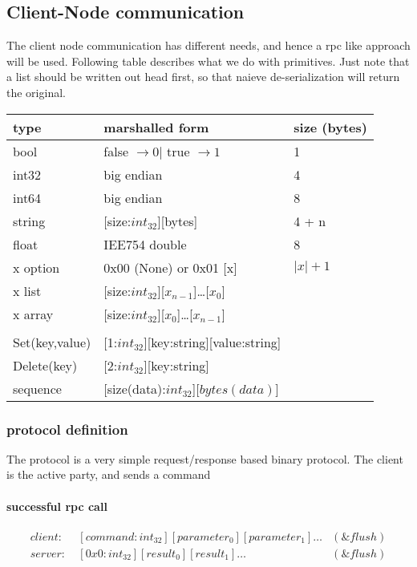 \subsection{Client-Node communication}
The client node communication has different needs, and hence a rpc like approach will be used. Following table describes what we do with primitives.
Just note that a list should be written out head first, so that naieve de-serialization will return the original.
\begin{table}[ht]
\begin{tabular}{lll}
type  &   marshalled form & size (bytes)          \\
\hline
bool        & false $\rightarrow 0 | $ true $ \rightarrow 1   $ & 1 \\
int32       & big endian          & 4             \\
int64       & big endian          & 8             \\
string      & [size:$int_{32}$][bytes] & 4 + n     \\
float       & IEE754 double       & 8             \\
x option    & 0x00 (None) or 0x01 [x] & $|x| + 1$ \\
x list      & [size:$int_{32}$][$x_{n-1}$]\ldots[$x_{0}$] \\
x array     & [size:$int_{32}$][$x_{0}$]\ldots[$x_{n-1}$] \\
\hline \\
Set(key,value) & [1:$int_{32}$][key:string][value:string]\\
Delete(key) & [2:$int_{32}$][key:string]\\
sequence    & [size(data):$int_{32}$][$bytes(data)$] \\
\hline
\end{tabular}
\end{table}

\subsubsection{protocol definition}
The protocol is a very simple request/response based binary protocol.
The client is the active party, and sends a command
\paragraph{successful rpc call}
\begin{equation*}
\begin{aligned}
client: \ & [command:int_{32}][parameter_0][parameter_1]\ldots & (\&flush) \\
server: \ & [0x0:int_{32}][result_0][result_1]\ldots & (\&flush)
\end{aligned}
\end{equation*}
